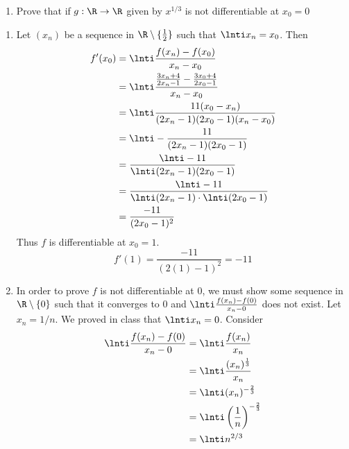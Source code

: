 \documentclass[11pt]{exam}
\begin{document}
\begin{enumerate}
\begin{enumerate}
                \item Prove that if $g: \R \to \R$ given by $x^{1/3}$ is not differentiable at $x_0 = 0$ 
            \end{enumerate}
                \begin{solution}
                    \begin{enumerate}
                        \item 
                        Let $(x_n)$ be a sequence in $\R \setminus \{\frac{1}{2}\}$ such that $\lnti x_n = x_0$. Then 
                        \begin{align*}
                            f'(x_0) &= \lnti \frac{f(x_n) - f(x_0)}{x_n - x_0} \\ 
                            &= \lnti \frac{\frac{3x_n + 4}{2x_n -1} -\frac{3x_0 + 4}{2x_0-1}}{x_n-x_0} \\
                            &= \lnti \frac{11(x_0 - x_n)}{(2x_n-1)(2x_0-1)(x_n-x_0)} \\
                            &= \lnti - \frac{11}{(2x_n-1)(2x_0-1)} \\
                            &= \frac{\lnti -11}{\lnti (2x_n - 1)(2x_0 - 1)} \\
                            &= \frac{\lnti -11}{\lnti (2x_n - 1) \cdot \lnti (2x_0 - 1)} \\
                            &= \frac{-11}{(2x_0 - 1)^2}
                        \end{align*}
                        Thus $f$ is differentiable at $x_0 = 1$.
                        $$f'(1) = \frac{-11}{(2(1) - 1)^2} = -11$$
                        \item In order to prove $f$ is not differentiable at 0, we must show some sequence in $\R \setminus \{0\}$ such that it 
                        converges to 0 and $\lnti \frac{f(x_n) - f(0)}{x_n - 0}$  does not exist. Let $x_n = 1/n$. We proved in class that 
                        $\lnti x_n = 0$. Consider
                        \begin{align*}
                            \lnti \frac{f(x_n) - f(0)}{x_n - 0} &= \lnti \frac{f(x_n)}{x_n} \\
                            &= \lnti \frac{(x_n)^{\frac{1}3{}}}{x_n} \\
                            &= \lnti (x_n)^{-\frac{2}{3}} \\
                            &= \lnti \left(\frac{1}{n}\right)^{-\frac{2}{3}} \\
                            &= \lnti n^{2/3}

\end{align*}
\end{enumerate}
\end{solution}
\end{enumerate}
\end{document}
